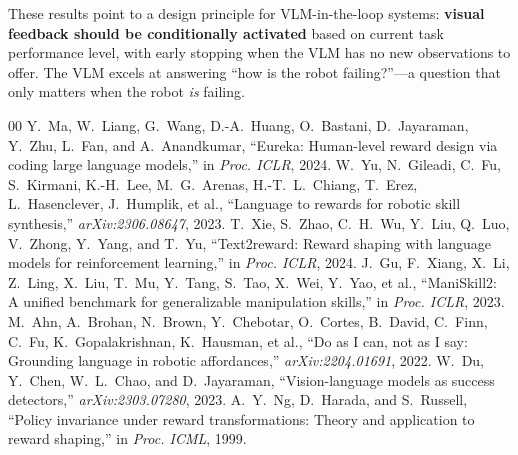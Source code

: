 \documentclass[conference]{IEEEtran}
\begin{document}
These results point to a design principle for VLM-in-the-loop systems:
\textbf{visual feedback should be conditionally activated} based on current
task performance level, with early stopping when the VLM has no new
observations to offer.
The VLM excels at answering ``how is the robot failing?''---a question that only
matters when the robot \emph{is} failing.



\begin{thebibliography}{00}
 Y.~Ma, W.~Liang, G.~Wang, D.-A.~Huang, O.~Bastani,
  D.~Jayaraman, Y.~Zhu, L.~Fan, and A.~Anandkumar, ``Eureka: Human-level
  reward design via coding large language models,'' in \emph{Proc. ICLR}, 2024.
 W.~Yu, N.~Gileadi, C.~Fu, S.~Kirmani, K.-H.~Lee, M.~G.~Arenas,
  H.-T.~L.~Chiang, T.~Erez, L.~Hasenclever, J.~Humplik, et al.,
  ``Language to rewards for robotic skill synthesis,'' \emph{arXiv:2306.08647}, 2023.
 T.~Xie, S.~Zhao, C.~H.~Wu, Y.~Liu, Q.~Luo, V.~Zhong,
  Y.~Yang, and T.~Yu, ``Text2reward: Reward shaping with language models for
  reinforcement learning,'' in \emph{Proc. ICLR}, 2024.
 J.~Gu, F.~Xiang, X.~Li, Z.~Ling, X.~Liu, T.~Mu,
  Y.~Tang, S.~Tao, X.~Wei, Y.~Yao, et al., ``ManiSkill2: A unified benchmark
  for generalizable manipulation skills,'' in \emph{Proc. ICLR}, 2023.
 M.~Ahn, A.~Brohan, N.~Brown, Y.~Chebotar, O.~Cortes,
  B.~David, C.~Finn, C.~Fu, K.~Gopalakrishnan, K.~Hausman, et al., ``Do as I
  can, not as I say: Grounding language in robotic affordances,''
  \emph{arXiv:2204.01691}, 2022.
 W.~Du, Y.~Chen, W.~L.~Chao, and D.~Jayaraman,
  ``Vision-language models as success detectors,'' \emph{arXiv:2303.07280}, 2023.
 A.~Y.~Ng, D.~Harada, and S.~Russell, ``Policy invariance under
  reward transformations: Theory and application to reward shaping,'' in
  \emph{Proc. ICML}, 1999.
\end{thebibliography}
\end{document}
